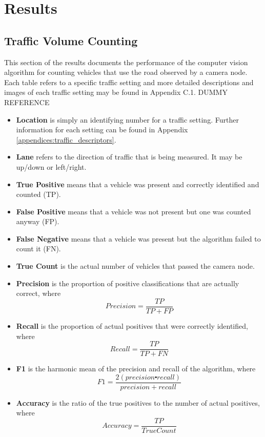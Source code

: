 \chapter{Results}

\section{Traffic Volume Counting}

This section of the results documents the performance of the computer vision algorithm for counting vehicles that use the road observed by a camera node. Each table refers to a specific traffic setting and more detailed descriptions and images of each traffic setting may be found in Appendix C.1. \cite{udacity_cv} DUMMY REFERENCE

\begin{itemize}
\item\textbf{Location} is simply an identifying number for a traffic setting. Further information for each setting can be found in Appendix \ref{appendices:traffic_descriptors}.
\item\textbf{Lane} refers to the direction of traffic that is being measured. It may be up/down or left/right.
\item\textbf{True Positive} means that a vehicle was present and correctly identified and counted (TP).
\item\textbf{False Positive} means that a vehicle was not present but one was counted anyway (FP).
\item\textbf{False Negative} means that a vehicle was present but the algorithm failed to count it (FN).
\item\textbf{True Count} is the actual number of vehicles that passed the camera node. 
\item\textbf{Precision} is the proportion of positive classifications that are actually correct, where \[Precision = \frac{TP}{TP + FP}\]
\item\textbf{Recall} is the proportion of actual positives that were correctly identified, where \[Recall = \frac{TP}{TP + FN}\]
\item\textbf{F1} is the harmonic mean of the precision and recall of the algorithm, where \[F1 = \frac{2(precision \centerdot recall)}{precision + recall}\]
\item\textbf{Accuracy} is the ratio of the true positives to the number of actual positives, where \[Accuracy = \frac{TP}{True Count}\]
\end{itemize}



